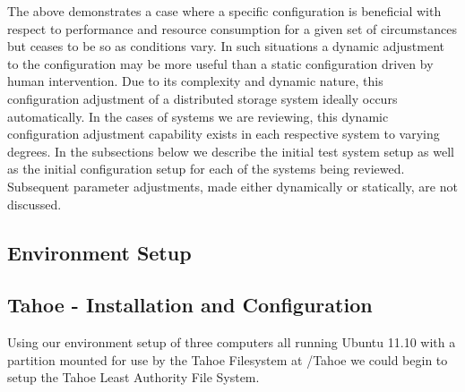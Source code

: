 \documentclass[11pt]{article}
\begin{document}
The above demonstrates a case where a specific configuration is beneficial 
with respect to performance and resource consumption for a given set of 
circumstances but ceases to be so as conditions vary. In such situations 
a dynamic adjustment to the configuration may be more useful than a static 
configuration driven by human intervention. Due to its complexity and 
dynamic nature, this configuration adjustment of a distributed storage 
system ideally occurs automatically. In the cases of systems we are 
reviewing, this dynamic configuration adjustment capability exists in 
each respective system to varying degrees. In the subsections below we 
describe the initial test system setup as well as the initial 
configuration setup for each of the systems being reviewed. Subsequent 
parameter adjustments, made either dynamically or statically, are not 
discussed.  

\subsection{Environment Setup}



\subsection{Tahoe - Installation and Configuration}
Using our environment setup of three computers all running Ubuntu
11.10 with a partition mounted for use by the Tahoe Filesystem at
/Tahoe we could begin to setup the Tahoe Least Authority File System.
\end{document}

